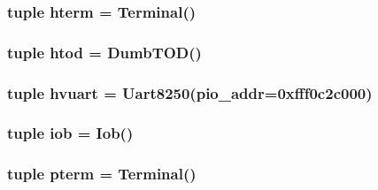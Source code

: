 \hypertarget{classT1000_1_1T1000_a6d899b7544626dab4ba02bc89ed95d75}{
\subsubsection[{hterm}]{\setlength{\rightskip}{0pt plus 5cm}tuple {\bf hterm} = {\bf Terminal}()}}
\label{classT1000_1_1T1000_a6d899b7544626dab4ba02bc89ed95d75}
\hypertarget{classT1000_1_1T1000_a50e265cc7986e7e4eb153fdb6aaa5438}{
\subsubsection[{htod}]{\setlength{\rightskip}{0pt plus 5cm}tuple {\bf htod} = {\bf DumbTOD}()}}
\label{classT1000_1_1T1000_a50e265cc7986e7e4eb153fdb6aaa5438}
\hypertarget{classT1000_1_1T1000_a3a13779e41d1cff39c0ed34996932c9c}{
\subsubsection[{hvuart}]{\setlength{\rightskip}{0pt plus 5cm}tuple {\bf hvuart} = {\bf Uart8250}(pio\_\-addr=0xfff0c2c000)}}
\label{classT1000_1_1T1000_a3a13779e41d1cff39c0ed34996932c9c}
\hypertarget{classT1000_1_1T1000_ac70fa525ba610375c986dad16b8195d9}{
\subsubsection[{iob}]{\setlength{\rightskip}{0pt plus 5cm}tuple {\bf iob} = {\bf Iob}()}}
\label{classT1000_1_1T1000_ac70fa525ba610375c986dad16b8195d9}
\hypertarget{classT1000_1_1T1000_a4a5dca31994bd39c47b8e64cd61e2bb5}{
\subsubsection[{pterm}]{\setlength{\rightskip}{0pt plus 5cm}tuple {\bf pterm} = {\bf Terminal}()}}
